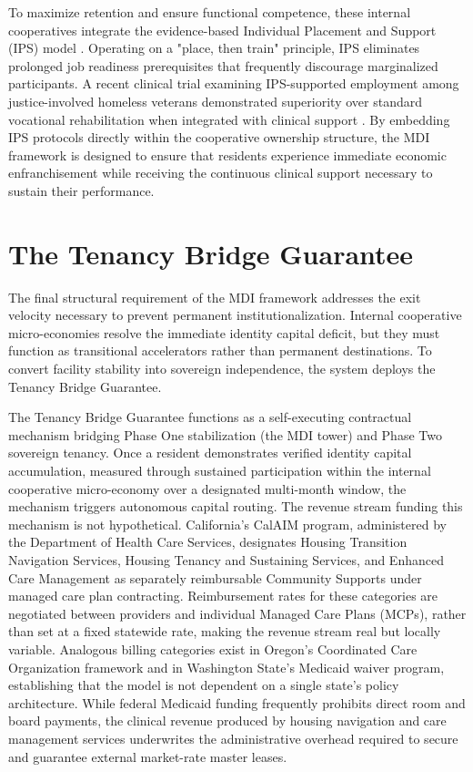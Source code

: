 \documentclass[12pt, letterpaper]{article}
\begin{document}
To maximize retention and ensure functional competence, these internal cooperatives integrate the evidence-based Individual Placement and Support (IPS) model \cite{drake2012individual}. Operating on a "place, then train" principle, IPS eliminates prolonged job readiness prerequisites that frequently discourage marginalized participants. A recent clinical trial examining IPS-supported employment among justice-involved homeless veterans demonstrated superiority over standard vocational rehabilitation when integrated with clinical support \cite{lepage2021individualized}. By embedding IPS protocols directly within the cooperative ownership structure, the MDI framework is designed to ensure that residents experience immediate economic enfranchisement while receiving the continuous clinical support necessary to sustain their performance.

\section{The Tenancy Bridge Guarantee}\label{sec:tbg}

The final structural requirement of the MDI framework addresses the exit velocity necessary to prevent permanent institutionalization. Internal cooperative micro-economies resolve the immediate identity capital deficit, but they must function as transitional accelerators rather than permanent destinations. To convert facility stability into sovereign independence, the system deploys the Tenancy Bridge Guarantee.

The Tenancy Bridge Guarantee functions as a self-executing contractual mechanism bridging Phase One stabilization (the MDI tower) and Phase Two sovereign tenancy. Once a resident demonstrates verified identity capital accumulation, measured through sustained participation within the internal cooperative micro-economy over a designated multi-month window, the mechanism triggers autonomous capital routing. The revenue stream funding this mechanism is not hypothetical. California's CalAIM program, administered by the Department of Health Care Services, designates Housing Transition Navigation Services, Housing Tenancy and Sustaining Services, and Enhanced Care Management as separately reimbursable Community Supports under managed care plan contracting. Reimbursement rates for these categories are negotiated between providers and individual Managed Care Plans (MCPs), rather than set at a fixed statewide rate, making the revenue stream real but locally variable. Analogous billing categories exist in Oregon's Coordinated Care Organization framework and in Washington State's Medicaid waiver program, establishing that the model is not dependent on a single state's policy architecture. While federal Medicaid funding frequently prohibits direct room and board payments, the clinical revenue produced by housing navigation and care management services underwrites the administrative overhead required to secure and guarantee external market-rate master leases.
\end{document}
